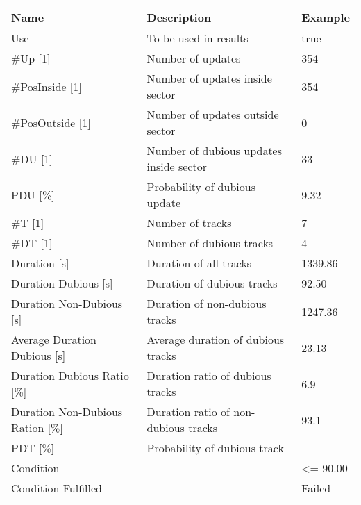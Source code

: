 \begin{center}
 \begin{table}[H]
  \begin{tabularx}{\textwidth}{ | l | X |  l | }
    \hline
    \textbf{Name} & \textbf{Description} & \textbf{Example} \\ \hline
    Use & To be used in results & true \\ \hline
    \#Up [1] & Number of updates & 354 \\ \hline
    \#PosInside [1] & Number of updates inside sector & 354 \\ \hline
    \#PosOutside [1] & Number of updates outside sector & 0 \\ \hline
    \#DU [1] & Number of dubious updates inside sector & 33 \\ \hline
    PDU [\%] & Probability of dubious update & 9.32 \\ \hline
    \#T [1] & Number of tracks & 7 \\ \hline
    \#DT [1] & Number of dubious tracks & 4 \\ \hline
    Duration [s] & Duration of all tracks & 1339.86 \\ \hline
    Duration Dubious [s] & Duration of dubious tracks & 92.50 \\ \hline
    Duration Non-Dubious [s] & Duration of non-dubious tracks & 1247.36 \\ \hline
    Average Duration Dubious [s] & Average duration of dubious tracks & 23.13 \\ \hline
    Duration Dubious Ratio [\%] & Duration ratio of dubious tracks & 6.9 \\ \hline
    Duration Non-Dubious Ration [\%] & Duration ratio of non-dubious tracks & 93.1 \\ \hline
    PDT [\%] & Probability of dubious track &  \\ \hline
    Condition &  & <= 90.00 \\ \hline
    Condition Fulfilled &  & Failed \\ \hline
\end{tabularx}
\end{table}
\end{center}
